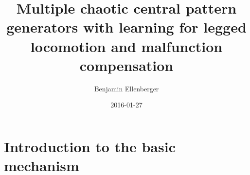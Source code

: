\documentclass{beamer}
\author{Benjamin Ellenberger}
\institute{INI:  Institute of Neuroinformatics}
\title{Multiple chaotic central pattern generators with learning for legged locomotion and malfunction compensation}
\date{2016-01-27}
\begin{document}
\titleframe

\section{}

\section{Introduction to the basic mechanism}

\end{document}

